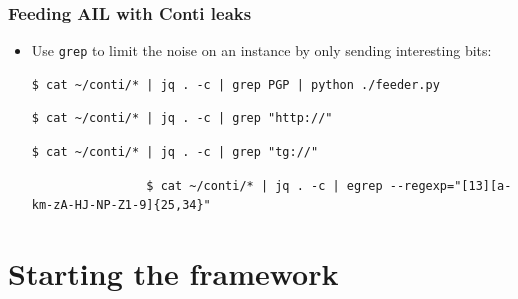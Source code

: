 \documentclass[10pt,aspectratio=169, colorlinks=true, linkcolor=circlBlue]{beamer}
\begin{document}
\begin{frame}[fragile]
    \frametitle{Feeding AIL with Conti leaks}

    \begin{itemize}
        \item Use \texttt{grep} to limit the noise on an instance by only sending interesting bits:
                \begin{tcolorbox}[colback=black!85, coltext=green, title=Filter for PGP keys, fonttitle=\bfseries, arc=2mm, boxrule=0.4pt]
\begin{verbatim}
$ cat ~/conti/* | jq . -c | grep PGP | python ./feeder.py
\end{verbatim}
                \end{tcolorbox}
                
                \begin{tcolorbox}[colback=black!85, coltext=green, title=Filter for .onion URLs, fonttitle=\bfseries, arc=2mm, boxrule=0.4pt]
\begin{verbatim}
$ cat ~/conti/* | jq . -c | grep "http://"
\end{verbatim}
                \end{tcolorbox}

                \begin{tcolorbox}[colback=black!85, coltext=green, title=Filter for Telegram links, fonttitle=\bfseries, arc=2mm, boxrule=0.4pt]
\begin{verbatim}
$ cat ~/conti/* | jq . -c | grep "tg://"
\end{verbatim}
                \end{tcolorbox}

                \begin{tcolorbox}[colback=black!85, coltext=green, title=Filter for Bitcoin addresses, 
    fonttitle=\bfseries, arc=2mm, boxrule=0.4pt, fontupper=\scriptsize\ttfamily]
			\begin{verbatim}
				$ cat ~/conti/* | jq . -c | egrep --regexp="[13][a-km-zA-HJ-NP-Z1-9]{25,34}"
			\end{verbatim}
		\end{tcolorbox}
    \end{itemize}

\end{frame}

\section{Starting the framework}
\end{document}

